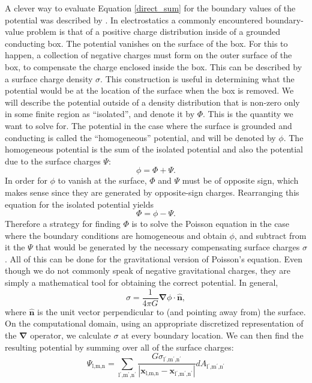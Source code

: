 \documentclass[12pt,preprint]{aastex}
\begin{document}
A clever way to evaluate Equation \ref{direct_sum} for the boundary values of the potential was described by \cite{james77}. In electrostatics a commonly encountered boundary-value problem is that of a positive charge distribution inside of a grounded conducting box. The potential vanishes on the surface of the box. For this to happen, a collection of negative charges must form on the outer surface of the box, to compensate the charge enclosed inside the box. This can be described by a surface charge density $\sigma$. This construction is useful in determining what the potential would be at the location of the surface when the box is removed. We will describe the potential outside of a density distribution that is non-zero only in some finite region as ``isolated'', and denote it by $\Phi$. This is the quantity we want to solve for. The potential in the case where the surface is grounded and conducting is called the ``homogeneous'' potential, and will be denoted by $\phi$. The homogeneous potential is the sum of the isolated potential and also the potential due to the surface charges $\Psi$:
\begin{equation*}
  \phi = \Phi + \Psi.
\end{equation*}
In order for $\phi$ to vanish at the surface, $\Phi$ and $\Psi$ must be of opposite sign, which makes sense since they are generated by opposite-sign charges. Rearranging this equation for the isolated potential yields
\begin{equation}
  \Phi = \phi - \Psi.
\end{equation}
Therefore a strategy for finding $\Phi$ is to solve the Poisson equation in the case where the boundary conditions are homogeneous and obtain $\phi$, and subtract from it the $\Psi$ that would be generated by the necessary compensating surface charges $\sigma$. All of this can be done for the gravitational version of Poisson's equation. Even though we do not commonly speak of negative gravitational charges, they are simply a mathematical tool for obtaining the correct potential. In general,
\begin{equation}
  \sigma = \frac{1}{4\pi G} {\bm{\nabla}} \phi \cdot \hat{\mathbf{n}},
\end{equation}
where $\hat{\mathbf{n}}$ is the unit vector perpendicular to (and pointing away from) the surface. On the computational domain, using an appropriate discretized representation of the ${\bm{\nabla}}$ operator, we calculate $\sigma$ at every boundary location. We can then find the resulting potential by summing over all of the surface charges:
\begin{equation}
  \Psi_{\text{l,m,n}} = \sum_{\text{l$^\prime$,m$^\prime$,n$^\prime$}} \frac{G\sigma_{\text{l$^\prime$,m$^\prime$,n$^\prime$}}}{\left|\mathbf{x}_{\text{l,m,n}} - \mathbf{x}_{\text{l$^\prime$,m$^\prime$,n$^\prime$}}\right|} dA_{\text{l$^\prime$,m$^\prime$,n$^\prime$}}
\end{equation}
\end{document}
